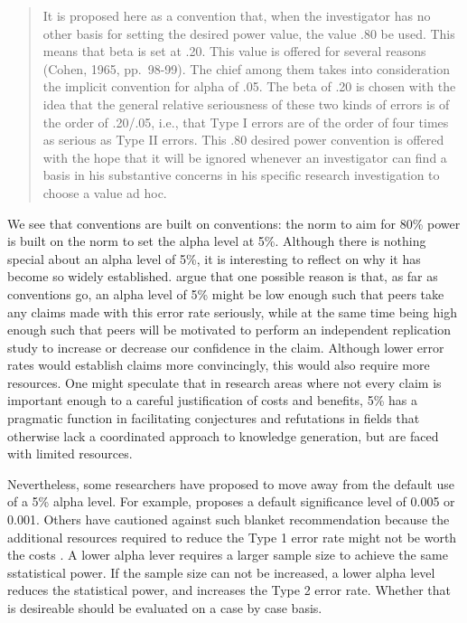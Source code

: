 \documentclass[
]{krantz}
\begin{document}
\begin{quote}
It is proposed here as a convention that, when the investigator has no other basis for setting the desired power value, the value .80 be used. This means that beta is set at .20. This value is offered for several reasons (Cohen, 1965, pp.~98-99). The chief among them takes into consideration the implicit convention for alpha of .05. The beta of .20 is chosen with the idea that the general relative seriousness of these two kinds of errors is of the order of .20/.05, i.e., that Type I errors are of the order of four times as serious as Type II errors. This .80 desired power convention is offered with the hope that it will be ignored whenever an investigator can find a basis in his substantive concerns in his specific research investigation to choose a value ad hoc.
\end{quote}

We see that conventions are built on conventions: the norm to aim for 80\% power is built on the norm to set the alpha level at 5\%. Although there is nothing special about an alpha level of 5\%, it is interesting to reflect on why it has become so widely established. \citet{uygun_tunc_epistemic_2021} argue that one possible reason is that, as far as conventions go, an alpha level of 5\% might be low enough such that peers take any claims made with this error rate seriously, while at the same time being high enough such that peers will be motivated to perform an independent replication study to increase or decrease our confidence in the claim. Although lower error rates would establish claims more convincingly, this would also require more resources. One might speculate
that in research areas where not every claim is important enough to a careful justification of costs and benefits, 5\% has a pragmatic function in facilitating conjectures and refutations in fields that otherwise lack a coordinated approach to knowledge generation, but are faced with limited resources.

Nevertheless, some researchers have proposed to move away from the default use of a 5\% alpha level. For example, \citet{johnson_revised_2013} proposes a default significance level of 0.005 or 0.001. Others have cautioned against such blanket recommendation because the additional resources required to reduce the Type 1 error rate might not be worth the costs \citep{lakens_justify_2018}. A lower alpha lever requires a larger sample size to achieve the same sstatistical power. If the sample size can not be increased, a lower alpha level reduces the statistical power, and increases the Type 2 error rate. Whether that is desireable should be evaluated on a case by case basis.
\end{document}
